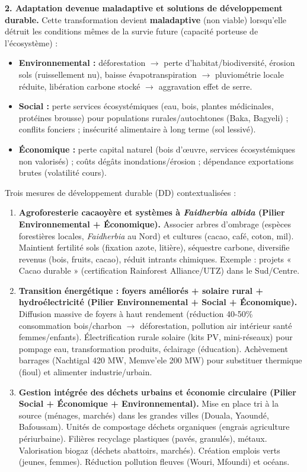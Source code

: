 \documentclass[11pt]{article}
\begin{document}
\begin{exoresolu}
\textbf{2. Adaptation devenue maladaptive et solutions de développement durable.} Cette transformation devient \textbf{maladaptive} (non viable) lorsqu'elle détruit les conditions mêmes de la survie future (capacité porteuse de l'écosystème) :
\begin{itemize}
\item \textbf{Environnemental :} déforestation $\rightarrow$ perte d'habitat/biodiversité, érosion sols (ruissellement nu), baisse évapotranspiration $\rightarrow$ pluviométrie locale réduite, libération carbone stocké $\rightarrow$ aggravation effet de serre.
\item \textbf{Social :} perte services écosystémiques (eau, bois, plantes médicinales, protéines brousse) pour populations rurales/autochtones (Baka, Bagyeli) ; conflits fonciers ; insécurité alimentaire à long terme (sol lessivé).
\item \textbf{Économique :} perte capital naturel (bois d'œuvre, services écosystémiques non valorisés) ; coûts dégâts inondations/érosion ; dépendance exportations brutes (volatilité cours).
\end{itemize}
Trois mesures de développement durable (DD) contextualisées :
\begin{enumerate}
\item \textbf{Agroforesterie cacaoyère et systèmes à \emph{Faidherbia albida} (Pilier Environnemental + Économique).} Associer arbres d'ombrage (espèces forestières locales, \emph{Faidherbia} au Nord) et cultures (cacao, café, coton, mil). Maintient fertilité sols (fixation azote, litière), séquestre carbone, diversifie revenus (bois, fruits, cacao), réduit intrants chimiques. Exemple : projets « Cacao durable » (certification Rainforest Alliance/UTZ) dans le Sud/Centre.
\item \textbf{Transition énergétique : foyers améliorés + solaire rural + hydroélectricité (Pilier Environnemental + Social + Économique).} Diffusion massive de foyers à haut rendement (réduction 40-50\% consommation bois/charbon $\rightarrow$ déforestation, pollution air intérieur santé femmes/enfants). Électrification rurale solaire (kits PV, mini-réseaux) pour pompage eau, transformation produits, éclairage (éducation). Achèvement barrages (Nachtigal 420 MW, Memve'ele 200 MW) pour substituer thermique (fioul) et alimenter industrie/urbain.
\item \textbf{Gestion intégrée des déchets urbains et économie circulaire (Pilier Social + Économique + Environnemental).} Mise en place tri à la source (ménages, marchés) dans les grandes villes (Douala, Yaoundé, Bafoussam). Unités de compostage déchets organiques (engrais agriculture périurbaine). Filières recyclage plastiques (pavés, granulés), métaux. Valorisation biogaz (déchets abattoirs, marchés). Création emplois verts (jeunes, femmes). Réduction pollution fleuves (Wouri, Mfoundi) et océans.

\end{enumerate}
\end{exoresolu}
\end{document}
